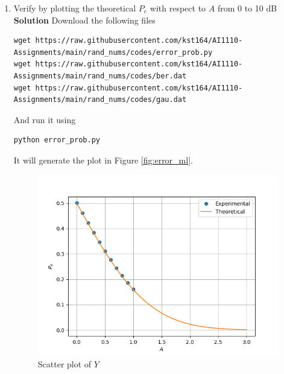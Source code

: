 \documentclass[journal, 12pt, twocolumn]{IEEEtran}
\begin{document}
\begin{enumerate}[label=\arabic{section}.\arabic*]
    \item
        Verify by plotting the theoretical $P_e$ with respect to $A$ from 0 to 10 dB
        \\
        \textbf{Solution} Download the following files
        \begin{lstlisting}
wget https://raw.githubusercontent.com/kst164/AI1110-Assignments/main/rand_nums/codes/error_prob.py
wget https://raw.githubusercontent.com/kst164/AI1110-Assignments/main/rand_nums/codes/ber.dat
wget https://raw.githubusercontent.com/kst164/AI1110-Assignments/main/rand_nums/codes/gau.dat
        \end{lstlisting}
        And run it using
        \begin{lstlisting}
python error_prob.py
        \end{lstlisting}
        It will generate the plot in Figure \eqref{fig:error_ml}.
        \begin{figure}[!ht]
            \includegraphics[width=\columnwidth]{figs/error_ml.png}
            \caption{Scatter plot of $Y$}
            \label{fig:error_ml}
        \end{figure}


\end{enumerate}
\end{document}
